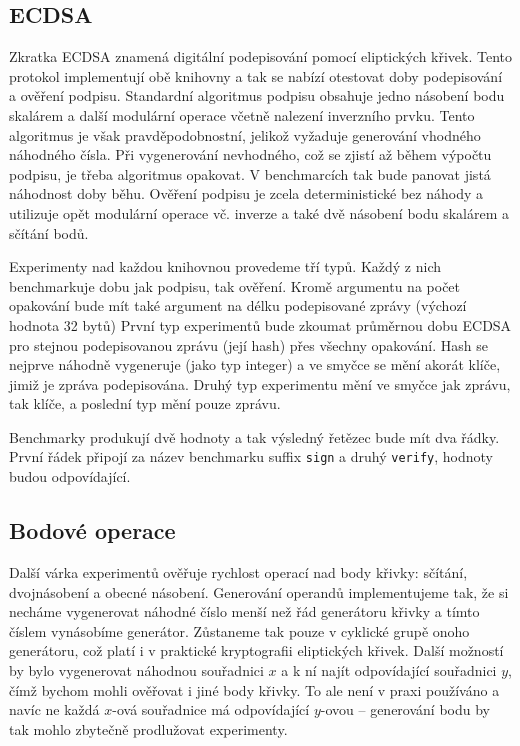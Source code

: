 \documentclass{article}
\theoremstyle{definition}
\begin{document}
\subsection{ECDSA}
Zkratka ECDSA znamená digitální podepisování pomocí eliptických křivek. Tento protokol implementují obě knihovny a tak se nabízí otestovat doby podepisování a ověření podpisu. Standardní algoritmus podpisu obsahuje jedno násobení bodu skalárem a další modulární operace včetně nalezení inverzního prvku. Tento algoritmus je však pravděpodobnostní, jelikož vyžaduje generování vhodného náhodného čísla. Při vygenerování nevhodného, což se zjistí až během výpočtu podpisu, je třeba algoritmus opakovat. V benchmarcích tak bude panovat jistá náhodnost doby běhu. Ověření podpisu je zcela deterministické bez náhody a utilizuje opět modulární operace vč. inverze a také dvě násobení bodu skalárem a sčítání bodů.

Experimenty nad každou knihovnou provedeme tří typů. Každý z nich benchmarkuje dobu jak podpisu, tak ověření. Kromě argumentu na počet opakování bude mít také argument na délku podepisované zprávy (výchozí hodnota 32 bytů) První typ experimentů bude zkoumat průměrnou dobu ECDSA pro stejnou podepisovanou zprávu (její hash) přes všechny opakování. Hash se nejprve náhodně vygeneruje (jako typ integer) a ve smyčce se mění akorát klíče, jimiž je zpráva podepisována. Druhý typ experimentu mění ve smyčce jak zprávu, tak klíče, a poslední typ mění pouze zprávu.

Benchmarky produkují dvě hodnoty a tak výsledný řetězec bude mít dva řádky. První řádek připojí za název benchmarku suffix \verb|sign| a druhý \verb|verify|, hodnoty budou odpovídající.

\subsection{Bodové operace}
Další várka experimentů ověřuje rychlost operací nad body křivky: sčítání, dvojnásobení a obecné násobení. Generování operandů implementujeme tak, že si necháme vygenerovat náhodné číslo menší než řád generátoru křivky a tímto číslem vynásobíme generátor. Zůstaneme tak pouze v cyklické grupě onoho generátoru, což platí i v praktické kryptografii eliptických křivek. Další možností by bylo vygenerovat náhodnou souřadnici $x$ a k ní najít odpovídající souřadnici $y$, čímž bychom mohli ověřovat i jiné body křivky. To ale není v praxi používáno a navíc ne každá $x$-ová souřadnice má odpovídající $y$-ovou -- generování bodu by tak mohlo zbytečně prodlužovat experimenty.
\end{document}

